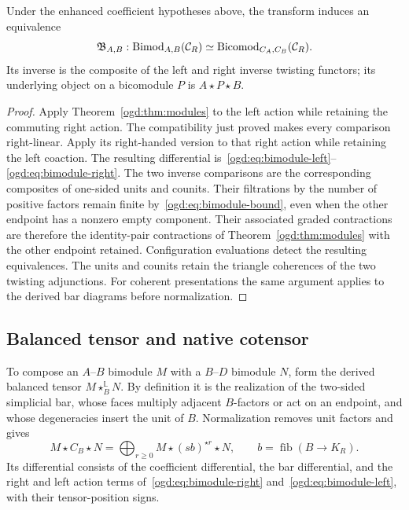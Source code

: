 \begin{theorem}\label{ogd:thm:bimodules}
Under the enhanced coefficient hypotheses above, the transform induces an equivalence
\[
 \mathfrak B_{A,B}:\operatorname{Bimod}_{A,B}(\mathcal C_R)
 \simeq\operatorname{Bicomod}_{C_A,C_B}(\mathcal C_R).
\]
Its inverse is the composite of the left and right inverse twisting functors; its underlying object on a bicomodule \(P\) is \(A\star P\star B\).
\end{theorem}
\begin{proof}
Apply Theorem~\ref{ogd:thm:modules} to the left action while retaining the commuting right action.
The compatibility just proved makes every comparison right-linear.
Apply its right-handed version to that right action while retaining the left coaction.
The resulting differential is~\eqref{ogd:eq:bimodule-left}--\eqref{ogd:eq:bimodule-right}.
The two inverse comparisons are the corresponding composites of one-sided units and counits.
Their filtrations by the number of positive factors remain finite by~\eqref{ogd:eq:bimodule-bound}, even when the other endpoint has a nonzero empty component.
Their associated graded contractions are therefore the identity-pair contractions of Theorem~\ref{ogd:thm:modules} with the other endpoint retained.
Configuration evaluations detect the resulting equivalences.
The units and counits retain the triangle coherences of the two twisting adjunctions.
For coherent presentations the same argument applies to the derived bar diagrams before normalization.
\end{proof}

\subsection{Balanced tensor and native cotensor}

To compose an \(A\)--\(B\) bimodule \(M\) with a \(B\)--\(D\) bimodule \(N\), form the derived balanced tensor \(M\star_B^{\mathbb L}N\).
By definition it is the realization of the two-sided simplicial bar, whose faces multiply adjacent \(B\)-factors or act on an endpoint, and whose degeneracies insert the unit of \(B\).
Normalization removes unit factors and gives
\begin{equation}\label{ogd:eq:balanced-bar}
 M\star C_B\star N
   =\bigoplus_{r\geq0}M\star(sb)^{\star r}\star N,
 \qquad b=\operatorname{fib}(B\to K_R).
\end{equation}
Its differential consists of the coefficient differential, the bar differential, and the right and left action terms of~\eqref{ogd:eq:bimodule-right} and~\eqref{ogd:eq:bimodule-left}, with their tensor-position signs.

